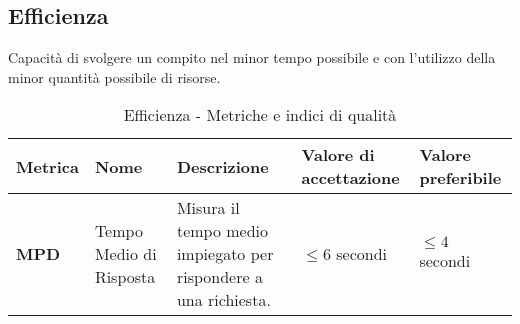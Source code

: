 \subsection{Efficienza}
Capacità di svolgere un compito nel minor tempo possibile e con l’utilizzo della minor quantità possibile di risorse.
\begin{table}[H]
    \centering
    \begin{tabular}{|C{1.5cm}|L{3cm}|L{4cm}|L{2.5cm}|L{2.5cm}|}
        \hline
        \textbf{Metrica} & \textbf{Nome} & \textbf{Descrizione} & \textbf{Valore di accettazione} & \textbf{Valore preferibile} \\
        \hline
        \textbf{MPD} & Tempo Medio di Risposta & Misura il tempo medio impiegato per rispondere a una richiesta. & $\leq 6$ secondi & $\leq 4$ secondi \\
        \hline
    \end{tabular}
    \caption{Efficienza - Metriche e indici di qualità}
    \label{tab:efficienza_qualita_prodotto}
\end{table}
